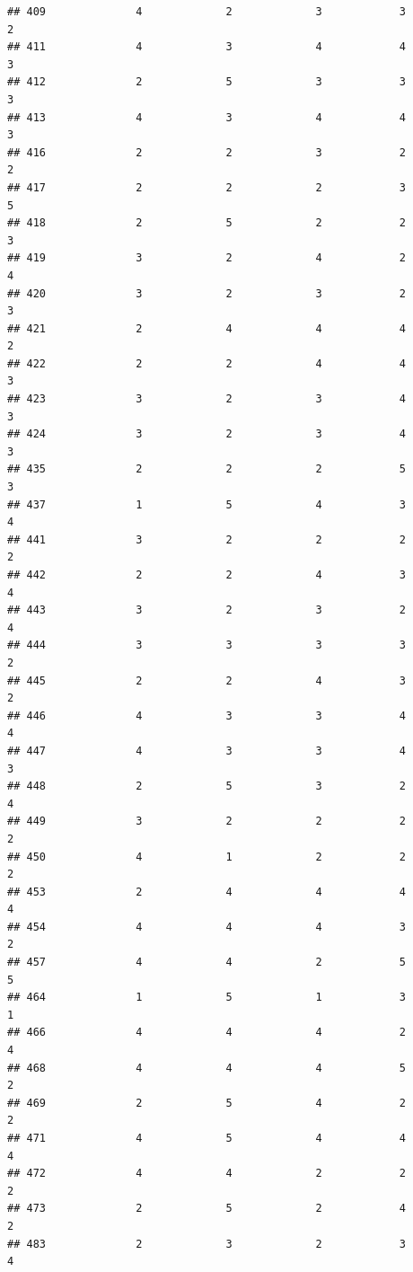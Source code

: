 \documentclass[
]{article}
\begin{document}
\begin{verbatim}
## 409              4             2             3            3          2
## 411              4             3             4            4          3
## 412              2             5             3            3          3
## 413              4             3             4            4          3
## 416              2             2             3            2          2
## 417              2             2             2            3          5
## 418              2             5             2            2          3
## 419              3             2             4            2          4
## 420              3             2             3            2          3
## 421              2             4             4            4          2
## 422              2             2             4            4          3
## 423              3             2             3            4          3
## 424              3             2             3            4          3
## 435              2             2             2            5          3
## 437              1             5             4            3          4
## 441              3             2             2            2          2
## 442              2             2             4            3          4
## 443              3             2             3            2          4
## 444              3             3             3            3          2
## 445              2             2             4            3          2
## 446              4             3             3            4          4
## 447              4             3             3            4          3
## 448              2             5             3            2          4
## 449              3             2             2            2          2
## 450              4             1             2            2          2
## 453              2             4             4            4          4
## 454              4             4             4            3          2
## 457              4             4             2            5          5
## 464              1             5             1            3          1
## 466              4             4             4            2          4
## 468              4             4             4            5          2
## 469              2             5             4            2          2
## 471              4             5             4            4          4
## 472              4             4             2            2          2
## 473              2             5             2            4          2
## 483              2             3             2            3          4

\end{verbatim}
\end{document}
